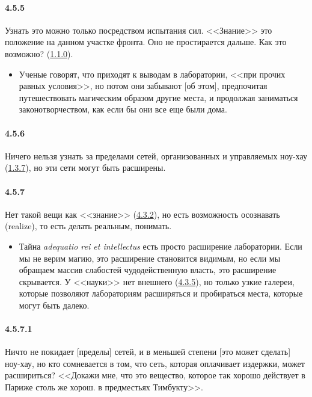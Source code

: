 \paragraph{4.5.5}\hypertarget{par:4.5.5}{} Узнать это можно только посредством испытания сил. <<Знание>> это положение на данном участке фронта. Оно не простирается дальше. Как это возможно? (\hyperlink{par:1.1.0}{1.1.0}).
	\begin{itemize}
	\item 
	Ученые говорят, что приходят к выводам в лаборатории, <<при прочих равных условия>>, но потом они забывают [об этом], предпочитая путешествовать магическим образом другие места, и продолжая заниматься законотворчеством, как если бы они все еще были дома.
	\end{itemize}	


\paragraph{4.5.6}\hypertarget{par:4.5.6}{} Ничего нельзя узнать за пределами сетей, организованных и управляемых ноу-хау (\hyperlink{par:1.3.7}{1.3.7}), но эти сети могут быть расширены.


\paragraph{4.5.7}\hypertarget{par:4.5.7}{} Нет такой вещи как <<знание>> (\hyperlink{par:4.3.2}{4.3.2}), но есть возможность осознавать (realize), то есть делать реальным, понимать. 
	\begin{itemize}
	\item 
	Тайна {\itshape adequatio rei et intellectus} есть просто расширение лаборатории. Если мы не верим магию, это расширение становится видимым, но если мы обращаем массив слабостей чудодейственную власть, это расширение скрывается. У <<науки>> нет внешнего (\hyperlink{par:4.3.5}{4.3.5}), но только узкие галереи, которые позволяют лабораториям расширяться и пробираться места, которые могут быть далеко. 
	\end{itemize}	

\paragraph{4.5.7.1}\hypertarget{par:4.5.7.1}{} Ничто не покидает [пределы] сетей, и в меньшей степени [это может сделать] ноу-хау, но кто сомневается в том, что сеть, которая оплачивает издержки, может расшириться? <<Докажи мне, что это вещество, которое так хорошо действует в Париже столь же хорош. в предместьях Тимбукту>>.

